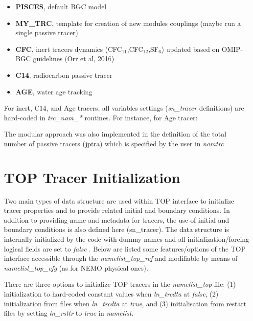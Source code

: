 \documentclass[../main/TOP_manual]{subfiles}
\begin{document}
\begin{itemize}
        \item \textbf{PISCES}, default BGC model
        \item \textbf{MY\_TRC}, template for creation of new modules couplings (maybe run a single passive tracer)
        \item \textbf{CFC}, inert tracers dynamics (CFC$_{11}$,CFC$_{12}$,SF$_{6}$) updated based on OMIP-BGC guidelines (Orr et al, 2016)
        \item \textbf{C14}, radiocarbon passive tracer
        \item \textbf{AGE}, water age tracking
\end{itemize}

For inert, C14, and Age tracers, all variables settings (\textit{sn\_tracer} definitions) are hard-coded in \textit{trc\_nam\_*} routines. For instance, for Age tracer:

The modular approach was also implemented in the definition of the total number of passive tracers (jptra) which is specified by the user in  \textit{namtrc}

\section{ TOP Tracer Initialization}

Two main types of data structure are used within TOP interface to initialize tracer properties and to provide related initial and boundary conditions. 
In addition to providing name and metadata for tracers, the use of initial and boundary conditions is also defined here (sn\_tracer).
The data structure is internally initialized by the code with dummy names and all initialization/forcing logical fields are set to \textit{false} .
Below are listed some features/options of the TOP interface accessible through the \textit{namelist\_top\_ref} and modifiable by means of \textit{namelist\_top\_cfg} (as for NEMO physical ones).

There are three options to initialize TOP tracers in the \textit{namelist\_top } file: (1) initialization to hard-coded constant values when \textit{ln\_trcdta} at \textit{false}, (2) initialization from files when \textit{ln\_trcdta} at \textit{true}, and (3) initialisation from restart files by setting \textit{ln\_rsttr} to \textit{true} in \textit{namelist}.
\end{document}
